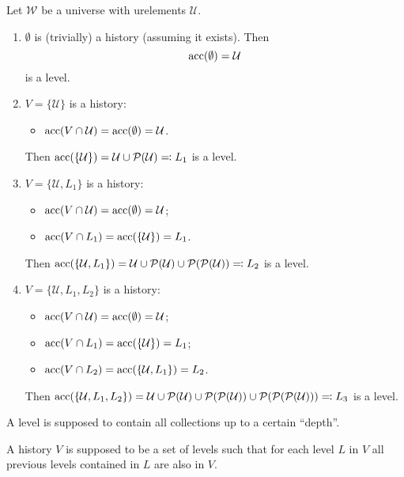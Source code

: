 \begin{example}
Let $\mathcal{W}$ be a universe with urelements $\mathcal{U}$.
\begin{enumerate}
\item $\emptyset$ is (trivially) a history (assuming it exists). Then
\[ \operatorname{acc}(\emptyset) = \mathcal{U} \]
is a level.
\item $V = \{\mathcal{U}\}$ is a history:
\begin{itemize}
\item $\operatorname{acc}(V\cap \mathcal{U}) = \operatorname{acc}(\emptyset) = \mathcal{U}$.
\end{itemize}
Then $\operatorname{acc}(\{\mathcal{U}\}) = \mathcal{U}\cup \operatorname{\mathcal{P}}(\mathcal{U}) \eqqcolon L_1$ is a level.
\item $V = \{\mathcal{U}, L_1\}$ is a history:
\begin{itemize}
\item $\operatorname{acc}(V \cap \mathcal{U}) = \operatorname{acc}(\emptyset) = \mathcal{U}$;
\item $\operatorname{acc}(V \cap L_1) = \operatorname{acc}(\{\mathcal{U}\}) = L_1$.
\end{itemize}
Then $\operatorname{acc}(\{\mathcal{U}, L_1\}) = \mathcal{U}\cup \operatorname{\mathcal{P}}(\mathcal{U})\cup \operatorname{\mathcal{P}}(\operatorname{\mathcal{P}}(\mathcal{U})) \eqqcolon L_2$ is a level.
\item $V = \{\mathcal{U}, L_1, L_2\}$ is a history:
\begin{itemize}
\item $\operatorname{acc}(V \cap \mathcal{U}) = \operatorname{acc}(\emptyset) = \mathcal{U}$;
\item $\operatorname{acc}(V \cap L_1) = \operatorname{acc}(\{\mathcal{U}\}) = L_1$;
\item $\operatorname{acc}(V \cap L_2) = \operatorname{acc}(\{\mathcal{U}, L_1\}) = L_2$.
\end{itemize}
Then $\operatorname{acc}(\{\mathcal{U}, L_1, L_2\}) = \mathcal{U}\cup \operatorname{\mathcal{P}}(\mathcal{U})\cup \operatorname{\mathcal{P}}(\operatorname{\mathcal{P}}(\mathcal{U}))\cup \operatorname{\mathcal{P}}(\operatorname{\mathcal{P}}(\operatorname{\mathcal{P}}(\mathcal{U}))) \eqqcolon L_3$ is a level.
\end{enumerate}
\end{example}

A level is supposed to contain all collections up to a certain ``depth''.

A history $V$ is supposed to be a set of levels such that for each level $L$ in $V$ all previous levels contained in $L$ are also in $V$.

